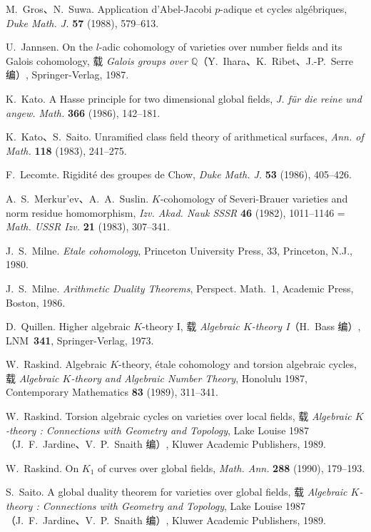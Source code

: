 \begin{description}[leftmargin=3.4em,labelsep=.5em,font=\normalfont]
\item[{[GS]}] M.~Gros、N.~Suwa. Application d'Abel-Jacobi $p$-adique et cycles algébriques, \textit{Duke Math. J.} \textbf{57} (1988), 579--613.
\item[{[J]}] U.~Jannsen. On the $l$-adic cohomology of varieties over number fields and its Galois cohomology, 载 \textit{Galois groups over $\mathbb Q$}（Y.~Ihara、K.~Ribet、J.-P.~Serre 编）, Springer-Verlag, 1987.
\item[{[K]}] K.~Kato. A Hasse principle for two dimensional global fields, \textit{J. für die reine und angew. Math.} \textbf{366} (1986), 142--181.
\item[{[KS]}] K.~Kato、S.~Saito. Unramified class field theory of arithmetical surfaces, \textit{Ann. of Math.} \textbf{118} (1983), 241--275.
\item[{[L]}] F.~Lecomte. Rigidité des groupes de Chow, \textit{Duke Math. J.} \textbf{53} (1986), 405--426.
\item[{[MS]}] A.~S.~Merkur'ev、A.~A.~Suslin. $K$-cohomology of Severi-Brauer varieties and norm residue homomorphism, \textit{Izv. Akad. Nauk SSSR} \textbf{46} (1982), 1011--1146 = \textit{Math. USSR Izv.} \textbf{21} (1983), 307--341.
\item[{[M1]}] J.~S.~Milne. \textit{Etale cohomology}, Princeton University Press, 33, Princeton, N.J., 1980.
\item[{[M2]}] J.~S.~Milne. \textit{Arithmetic Duality Theorems}, Perspect. Math.~1, Academic Press, Boston, 1986.
\item[{[Q]}] D.~Quillen. Higher algebraic $K$-theory I, 载 \textit{Algebraic $K$-theory I}（H.~Bass 编）, LNM~\textbf{341}, Springer-Verlag, 1973.
\item[{[R1]}] W.~Raskind. Algebraic $K$-theory, étale cohomology and torsion algebraic cycles, 载 \textit{Algebraic $K$-theory and Algebraic Number Theory}, Honolulu 1987, Contemporary Mathematics \textbf{83} (1989), 311--341.
\item[{[R2]}] W.~Raskind. Torsion algebraic cycles on varieties over local fields, 载 \textit{Algebraic $K$-theory : Connections with Geometry and Topology}, Lake Louise 1987（J.~F.~Jardine、V.~P.~Snaith 编）, Kluwer Academic Publishers, 1989.
\item[{[R3]}] W.~Raskind. On $K_1$ of curves over global fields, \textit{Math. Ann.} \textbf{288} (1990), 179--193.
\item[{[S1]}] S.~Saito. A global duality theorem for varieties over global fields, 载 \textit{Algebraic $K$-theory : Connections with Geometry and Topology}, Lake Louise 1987（J.~F.~Jardine、V.~P.~Snaith 编）, Kluwer Academic Publishers, 1989.

\end{description}

